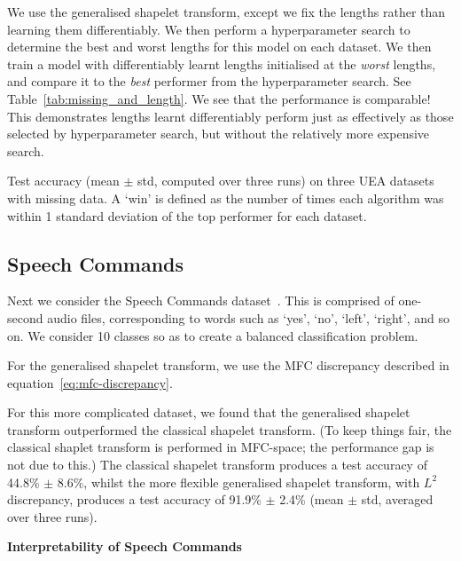 \documentclass{article}
\theoremstyle{plain}
\theoremstyle{definition}
\newcommand{\boldheading}[1]{

\textbf{#1}\quad}
\begin{document}
We use the generalised shapelet transform, except we fix the lengths rather than learning them differentiably. We then perform a hyperparameter search to determine the best and worst lengths for this model on each dataset. We then train a model with differentiably learnt lengths initialised at the \emph{worst} lengths, and compare it to the \emph{best} performer from the hyperparameter search. See Table~\ref{tab:missing_and_length}. We see that the performance is comparable! This demonstrates lengths learnt differentiably perform just as effectively as those selected by hyperparameter search, but without the relatively more expensive search.

\begin{table}[t]
    \centering
	\caption{Test accuracy (mean $\pm$ std, computed over three runs) on three UEA datasets with missing data. A `win' is defined as the number of times each algorithm was within 1 standard deviation of the top performer for each dataset.}\label{tab:missing_and_length}
    
\end{table}


\subsection{Speech Commands}
Next we consider the Speech Commands dataset~\cite{warden2018speech}. This is comprised of one-second audio files, corresponding to words such as `yes', `no', `left', `right', and so on. We consider 10 classes so as to create a balanced classification problem.

For the generalised shapelet transform, we use the MFC discrepancy described in equation~\eqref{eq:mfc-discrepancy}.%

For this more complicated dataset, we found that the generalised shapelet transform outperformed the classical shapelet transform. (To keep things fair, the classical shaplet transform is performed in MFC-space; the performance gap is not due to this.) The classical shapelet transform produces a test accuracy of 44.8\% $\pm$ 8.6\%, whilst the more flexible generalised shapelet transform, with $L^2$ discrepancy, produces a test accuracy of 91.9\% $\pm$ 2.4\% (mean $\pm$ std, averaged over three runs).

\boldheading{Interpretability of Speech Commands}
\end{document}
